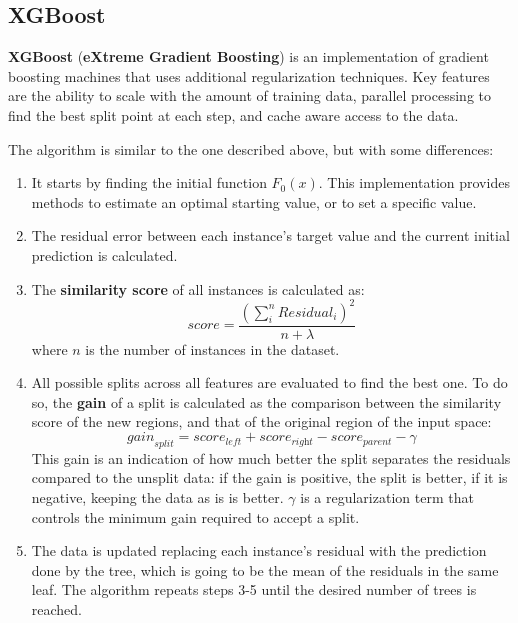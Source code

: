 \subsection{XGBoost}

\textbf{XGBoost} (\textbf{eXtreme Gradient Boosting}) is an implementation of gradient boosting machines that uses additional regularization techniques. Key features are the ability to scale with the amount of training data, parallel processing to find the best split point at each step, and cache aware access to the data.

The algorithm is similar to the one described above, but with some differences:
\begin{enumerate}
    \item It starts by finding the initial function $F_0(x)$. This implementation provides methods to estimate an optimal starting value, or to set a specific value.
    
    \item The residual error between each instance's target value and the current initial prediction is calculated.

    \item The \textbf{similarity score} of all instances is calculated as:
    \begin{equation*}
        \textit{score} = \frac{(\sum_i^n \textit{Residual}_i)^2}{n + \lambda}
    \end{equation*}
    where $n$ is the number of instances in the dataset.

    \item All possible splits across all features are evaluated to find the best one. To do so, the \textbf{gain} of a split is calculated as the comparison between the similarity score of the new regions, and that of the original region of the input space:
    \begin{equation*}
        \textit{gain}_{split} = \textit{score}_{\textit{left}} + \textit{score}_{\textit{right}} - \textit{score}_{\textit{parent}} - \gamma
    \end{equation*}
    This gain is an indication of how much better the split separates the residuals compared to the unsplit data: if the gain is positive, the split is better, if it is negative, keeping the data as is is better. $\gamma$ is a regularization term that controls the minimum gain required to accept a split.

    \item The data is updated replacing each instance's residual with the prediction done by the tree, which is going to be the mean of the residuals in the same leaf. The algorithm repeats steps 3-5 until the desired number of trees is reached.
\end{enumerate}

